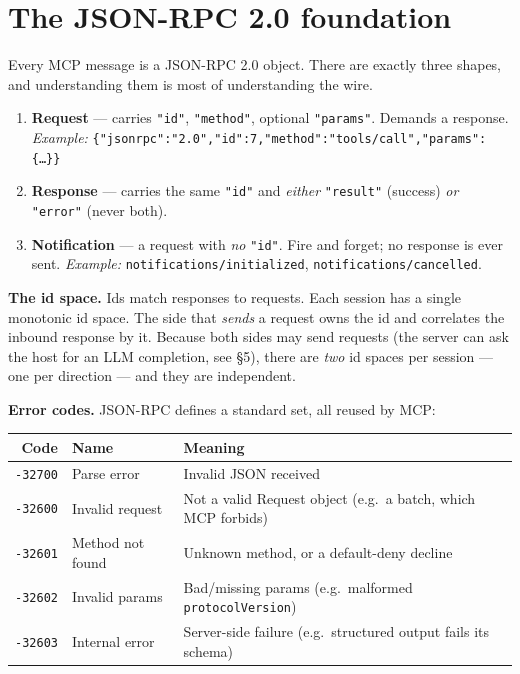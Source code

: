 \documentclass[10pt]{article}
\newcommand{\code}[1]{\texttt{\small #1}}
\begin{document}
\section{The JSON-RPC 2.0 foundation}

Every MCP message is a JSON-RPC 2.0 object. There are exactly three shapes, and
understanding them is most of understanding the wire.

\begin{enumerate}
  \item \textbf{Request} --- carries \code{"id"}, \code{"method"}, optional
    \code{"params"}. Demands a response. \emph{Example:}
    \code{\{"jsonrpc":"2.0","id":7,"method":"tools/call","params":\{\dots\}\}}
  \item \textbf{Response} --- carries the same \code{"id"} and \emph{either}
    \code{"result"} (success) \emph{or} \code{"error"} (never both).
  \item \textbf{Notification} --- a request with \emph{no} \code{"id"}. Fire and
    forget; no response is ever sent. \emph{Example:}
    \code{notifications/initialized}, \code{notifications/cancelled}.
\end{enumerate}

\textbf{The id space.} Ids match responses to requests. Each session has a
single monotonic id space. The side that \emph{sends} a request owns the id and
correlates the inbound response by it. Because both sides may send requests
(the server can ask the host for an LLM completion, see \S5), there are
\emph{two} id spaces per session --- one per direction --- and they are
independent.

\textbf{Error codes.} JSON-RPC defines a standard set, all reused by MCP:

\begin{center}\small
\begin{tabular}{r l l}
\toprule
Code & Name & Meaning \\
\midrule
\code{-32700} & Parse error      & Invalid JSON received \\
\code{-32600} & Invalid request  & Not a valid Request object (e.g.\ a batch, which MCP forbids) \\
\code{-32601} & Method not found & Unknown method, or a default-deny decline \\
\code{-32602} & Invalid params   & Bad/missing params (e.g.\ malformed \code{protocolVersion}) \\
\code{-32603} & Internal error   & Server-side failure (e.g.\ structured output fails its schema) \\
\bottomrule
\end{tabular}
\end{center}
\end{document}
